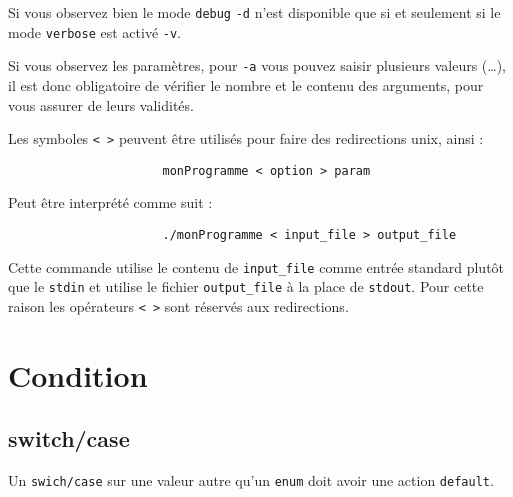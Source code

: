 		Si vous observez bien le mode \verb+debug+ \verb+-d+ n'est disponible que si et seulement si le mode \verb+verbose+ est activé \verb+-v+.

		Si vous observez les paramètres, pour \verb+-a+ vous pouvez saisir plusieurs valeurs (\dots), il est donc obligatoire de vérifier le nombre et le contenu des arguments, pour vous assurer de leurs validités.

		Les symboles \verb+< >+ peuvent être utilisés pour faire des redirections unix, ainsi :

		\begin{figure}[H]
			\begin{changemargin}{-2.5cm}{-2.5cm}
			\begin{tcolorbox}
			\begin{verbatim}
				monProgramme < option > param
			\end{verbatim}
			\end{tcolorbox}
			\end{changemargin}
		\end{figure}

		Peut être interprété comme suit : 

		\begin{figure}[H]
			\begin{changemargin}{-2.5cm}{-2.5cm}
			\begin{tcolorbox}
			\begin{verbatim}
				./monProgramme < input_file > output_file
			\end{verbatim}
			\end{tcolorbox}
			\end{changemargin}
		\end{figure}

		Cette commande utilise le contenu de \verb+input_file+ comme entrée standard plutôt que le \verb+stdin+ et utilise le fichier \verb+output_file+ à la place de \verb+stdout+. Pour cette raison les opérateurs \verb+< >+ sont réservés aux redirections.
			
	\section{Condition}
		\subsection{switch/case}
			Un \verb+swich/case+ sur une valeur autre qu'un \verb+enum+ doit avoir une action \verb+default+.

